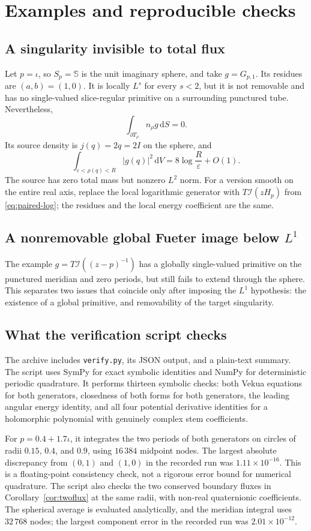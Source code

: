 \documentclass[11pt,a4paper]{article}
\numberwithin{equation}{section}
\theoremstyle{definition}
\theoremstyle{remark}
\newcommand{\SSS}{\mathbb S}
\newcommand{\ic}{\iota}
\newcommand{\dd}{\,\mathrm d}
\newcommand{\cI}{\mathcal I}
\begin{document}
\section{Examples and reproducible checks}
\label{sec:checks}

\subsection{A singularity invisible to total flux}
Let $p=\ic$, so $S_p=\SSS$ is the unit imaginary sphere, and take
$g=G_{p,1}$. Its residues are $(a,b)=(1,0)$. It is locally $L^s$ for every
$s<2$, but it is not removable and has no single-valued slice-regular
primitive on a surrounding punctured tube. Nevertheless,
\[
 \int_{\partial T_\rho}n_\rho g\dd S=0.
\]
Its source density is $j(q)=2q=2I$ on the sphere, and
\[
 \int_{\varepsilon<\rho(q)<R}|g(q)|^2\dd V
 =8\log\frac R\varepsilon+O(1).
\]
The source has zero total mass but nonzero $L^2$ norm. For a version smooth
on the entire real axis, replace the local logarithmic generator with
$T\cI(zH_p)$ from \eqref{eq:paired-log}; the residues and the local energy
coefficient are the same.

\subsection{A nonremovable global Fueter image below \texorpdfstring{$L^1$}{L1}}
The example $g=T\cI((z-p)^{-1})$ has a globally single-valued primitive on
the punctured meridian and zero periods, but still fails to extend through
the sphere. This separates two issues that coincide only after imposing the
$L^1$ hypothesis: the existence of a global primitive, and removability of
the target singularity.

\subsection{What the verification script checks}
The archive includes \texttt{verify.py}, its JSON output, and a plain-text
summary. The script uses SymPy for exact symbolic identities and NumPy for
deterministic periodic quadrature. It performs thirteen symbolic checks:
both Vekua equations for both generators, closedness of both forms for both
generators, the leading angular energy identity, and all four potential
derivative identities for a holomorphic polynomial with genuinely complex
stem coefficients.

For $p=0.4+1.7\ic$, it integrates the two periods of both generators on
circles of radii $0.15$, $0.4$, and $0.9$, using $16\,384$ midpoint nodes.
The largest absolute discrepancy from $(0,1)$ and $(1,0)$ in the recorded
run was $1.11\times10^{-16}$. This is a floating-point consistency check,
not a rigorous error bound for numerical quadrature.
The script also checks the two conserved boundary fluxes in
Corollary~\ref{cor:twoflux} at the same radii, with non-real quaternionic
coefficients. The spherical average is evaluated analytically, and the
meridian integral uses $32\,768$ nodes; the largest component error in the
recorded run was $2.01\times10^{-12}$.
\end{document}

